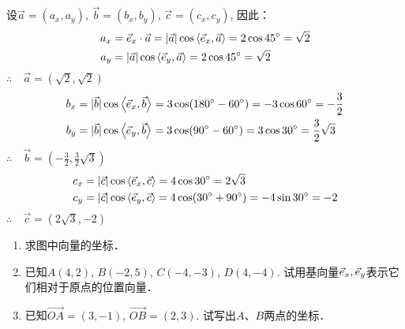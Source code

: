 \begin{solution}
设$\vec{a}=(a_x,a_y)$, $\vec{b}=(b_x,b_y)$, $\vec{c}=(c_x,c_y)$, 因此：
\[\begin{split}
a_x&=\vec{e}_x\cdot \vec{a}=|\vec{a}|\cos\left\langle \vec{e}_x,\vec{a} \right\rangle=2\cos 45^{\circ}=\sqrt{2}\\
a_y&=|\vec{a}|\cos\left\langle \vec{e}_y,\vec{a} \right\rangle=2\cos 45^{\circ}=\sqrt{2}\\
\end{split}\]
$\therefore\quad \vec{a}=\left(\sqrt{2},\sqrt{2}\right)$
\[\begin{split}
    b_x&=|\vec{b}|\cos\left\langle \vec{e}_x,\vec{b} \right\rangle=3\cos (180^{\circ}-60^{\circ})=-3\cos 60^{\circ}=-\dfrac{3}{2}\\
b_y&=|\vec{b}|\cos\left\langle \vec{e}_y,\vec{b} \right\rangle=3\cos (90^{\circ}-60^{\circ})=3\cos30^{\circ}=\dfrac{3}{2}\sqrt{3}\\
\end{split}\]
$\therefore\quad \vec{b}=\left(-\frac{3}{2},\frac{3}{2}\sqrt{3}\right)$
\[\begin{split}
c_x&=|\vec{c}|\cos\left\langle \vec{e}_x,\vec{c} \right\rangle=4\cos 30^{\circ}=2\sqrt{3}\\
c_y&=|\vec{c}|\cos\left\langle \vec{e}_y,\vec{c} \right\rangle=4\cos (30^{\circ}+90^{\circ})=-4\sin 30^{\circ}=-2\\
\end{split}\]
$\therefore\quad \vec{c}=\left(2\sqrt{3},-2\right)$
\end{solution}

\begin{ex}
\begin{enumerate}
    \item 求图中向量的坐标．
    \item 已知$A(4, 2)$, $B(-2, 5)$, $C(-4,-3)$, $D(4,-4)$. 试用基向量$\vec{e}_x,\vec{e}_y$表示它们相对于原点的位置向量．
    \item 已知$\Vec{OA}=(3,-1)$, $\Vec{OB}=(2, 3)$. 试写出$A$、$B$两点的坐标．
\end{enumerate}
\end{ex}

